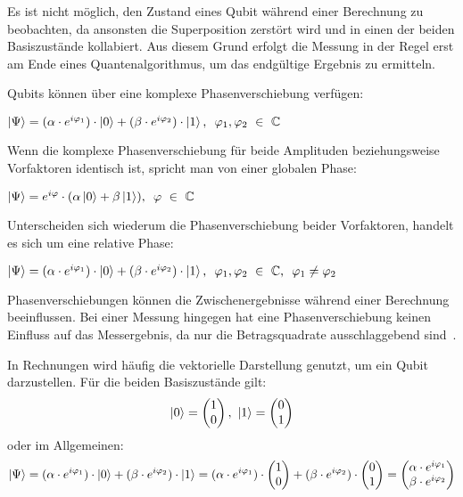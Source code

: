Es ist nicht möglich, 
den Zustand eines Qubit während einer Berechnung zu beobachten,
da ansonsten die Superposition zerstört wird und in einen der beiden Basiszustände kollabiert.
Aus diesem Grund erfolgt die Messung in der Regel erst am Ende eines Quantenalgorithmus, um das endgültige Ergebnis zu ermitteln.

\bigskip

Qubits können über eine komplexe Phasenverschiebung verfügen:
\begin{center}
  \(
    \ket{\Psi} = (\alpha \cdot e^{i\varphi_1}) \cdot \ket{0} + (\beta \cdot e^{i\varphi_2}) \cdot \ket{1}
    \text{, }~
    \varphi_1,\varphi_2~\in~\mathbb{C}
  \)
  \end{center}
Wenn die komplexe Phasenverschiebung für beide Amplituden beziehungsweise Vorfaktoren identisch ist, 
spricht man von einer globalen Phase:
\begin{center}
  \(
    \ket{\Psi} = e^{i\varphi} \cdot (\alpha \ket{0} + \beta  \ket{1} )
    \text{, }~
    \varphi~\in~\mathbb{C}
  \)
\end{center}
Unterscheiden sich wiederum die Phasenverschiebung beider Vorfaktoren, 
handelt es sich um eine relative Phase:
\begin{center}
  \(
    \ket{\Psi} = (\alpha \cdot e^{i\varphi_1}) \cdot \ket{0} + (\beta \cdot e^{i\varphi_2}) \cdot \ket{1}
    \text{, }~
    \varphi_1,\varphi_2~\in~\mathbb{C}
    \text{, }~
    \varphi_1 \neq \varphi_2
  \)
\end{center}
Phasenverschiebungen können die Zwischenergebnisse während einer Berechnung beeinflussen. 
Bei einer Messung hingegen hat eine Phasenverschiebung keinen Einfluss auf das Messergebnis, 
da nur die Betragsquadrate ausschlaggebend sind~\cite{Hoever2023QC}. 

\bigskip

In Rechnungen wird häufig die vektorielle Darstellung genutzt, 
um ein Qubit darzustellen. 
Für die beiden Basiszustände gilt:
\[
  \ket{0} = 
  \begin{pmatrix}
    1 \\
    0
  \end{pmatrix},~ 
  \ket{1} = 
  \begin{pmatrix}
    0 \\
    1
  \end{pmatrix}
  \]
oder im Allgemeinen:
\[
  \ket{\Psi} 
  =
  (\alpha \cdot e^{i\varphi_1}) \cdot \ket{0} + (\beta \cdot e^{i\varphi_2}) \cdot \ket{1}
  =  
  (\alpha \cdot e^{i\varphi_1}) \cdot 
  \begin{pmatrix}
    1 \\
    0
  \end{pmatrix} + (\beta \cdot e^{i\varphi_2}) \cdot 
  \begin{pmatrix}
    0 \\
    1
  \end{pmatrix} 
  =
  \begin{pmatrix}
    \alpha \cdot e^{i\varphi_1} \\
    \beta \cdot e^{i\varphi_2}
  \end{pmatrix}
\] 

